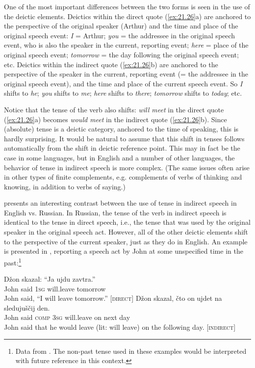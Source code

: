 One of the most important differences between the two forms is seen in the use of the deictic elements. Deictics within the direct quote (\ref{ex:21.26}a) are anchored to the perspective of the original speaker (Arthur) and the time and place of the original speech event: \textit{I} = Arthur; \textit{you} = the addressee in the original speech event, who is also the speaker in the current, reporting event; \textit{here} = place of the original speech event; \textit{tomorrow} = the day following the original speech event; etc. Deictics within the indirect quote (\ref{ex:21.26}b) are anchored to the perspective of the speaker in the current, reporting event (= the addressee in the original speech event), and the time and place of the current speech event. So \textit{I} shifts to \textit{he}; \textit{you} shifts to \textit{me}; \textit{here} shifts to \textit{there}; \textit{tomorrow} shifts to \textit{today}; etc.



Notice that the tense of the verb also shifts: \textit{will meet} in the direct quote (\ref{ex:21.26}a) becomes \textit{would meet} in the indirect quote (\ref{ex:21.26}b). Since (absolute) tense is a deictic category, anchored to the time of speaking, this is hardly surprising. It would be natural to assume that this shift in tenses follows automatically from the shift in deictic reference point. This may in fact be the case in some languages, but in English and a number of other languages, the behavior of tense in indirect speech is more complex. (The same issues often arise in other types of finite complements, e.g. complements of verbs of thinking and knowing, in addition to verbs of saying.)



\citet{Comrie1985} presents an interesting contrast between the use of tense in indirect speech in English vs. Russian. In Russian, the tense of the verb in indirect speech is identical to the tense in direct speech, i.e., the tense that was used by the original speaker in the original speech act. However, all of the other deictic elements shift to the perspective of the current speaker, just as they do in English. An example is presented in , reporting a speech act by John at some unspecified time in the past:\footnote{Data from \citet[109]{Comrie1985}. The non-past tense used in these examples would be interpreted with future reference in this context.}


\ea \label{ex:21.27}
\ea  
\gll Džon  skazal:  “Ja  ujdu  zavtra.”\\
John  said  \textsc{1sg}  will.leave  tomorrow\\
\glt John said, “I will leave tomorrow.”  [\textsc{direct}]
\ex 
\gll Džon  skazal,  čto  on  ujdet  na  sledujuščij  den.\\
John  said  \textsc{comp}  \textsc{3sg}  will.leave  on  next  day\\
\glt John said that he would leave (lit: will leave) on the following day.  [\textsc{indirect}]
\z \z



